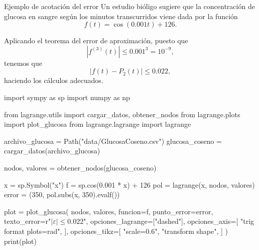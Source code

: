 \begin{frame}[fragile]{Ejemplo de acotación del error}
  Un estudio bióligo sugiere que la concentración de glucosa en sangre
  según los minutos transcurridos viene dada por la función
  \[
    f(t) = \cos(0.001t) + 126.
  \]

  \begin{multicols}{2}
    Aplicando el teorema del error de aproximación, puesto que
    \[
      \left\lvert f^{(3)}(t) \right\rvert \le 0.001^3 = 10^{-9},
    \]
    tenemos que
    \[
      \left\lvert f(t) - P_2(t) \right\rvert \le 0.022,
    \]
    haciendo los cálculos adecuados.

    \columnbreak

    \begin{pycode}
      import sympy as sp
      import numpy as np
  
      from lagrange.utils import cargar_datos, obtener_nodos
      from lagrange.plots import plot_glucosa
      from lagrange.lagrange import lagrange
  
      archivo_glucosa = Path("data/GlucosaCoseno.csv")
      glucosa_coseno = cargar_datos(archivo_glucosa)
  
      nodos, valores = obtener_nodos(glucosa_coseno)
  
      x = sp.Symbol("x")
      f = sp.cos(0.001 * x) + 126
      pol = lagrange(x, nodos, valores)
      error = (350, pol.subs(x, 350).evalf())
  
      plot = plot_glucosa(
        nodos,
        valores,
        funcion=f,
        punto_error=error,
        texto_error=r"$\left\lvert \varepsilon \right\rvert \le 0.022$",
        opciones_lagrange=["dashed"],
        opciones_axis=[
          "trig format plots=rad",
        ],
        opciones_tikz=[
          "scale=0.6",
          "transform shape",
        ]
      )
      print(plot)
    \end{pycode}
  \end{multicols}
\end{frame}
